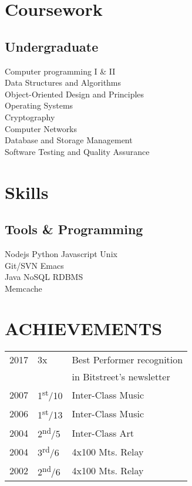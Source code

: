 \documentclass[]{deedy-resume-openfont}
\begin{document}
\begin{minipage}[t]{0.33\textwidth}

\section{Coursework}
\subsection{Undergraduate}
Computer programming I \& II\\
Data Structures and Algorithms\\ 
Object-Oriented Design and Principles\\
Operating Systems\\
Cryptography \\
Computer Networks \\
Database and Storage Management \\
Software Testing and Quality Assurance
\sectionsep


\section{Skills}
\subsection{Tools \& Programming}
Nodejs \textbullet{} Python \textbullet{} Javascript \textbullet{} Unix \\
Git/SVN \textbullet{} Emacs \\
Java \textbullet{} NoSQL \textbullet{} RDBMS\\
Memcache 
\sectionsep


\section{ACHIEVEMENTS}
\begin{tabular}{rll}
  2017 & 3x & Best Performer recognition\\
  & & in Bitstreet's newsletter\\
  2007 & 1\textsuperscript{st}/10 & Inter-Class Music\\
  2006 & 1\textsuperscript{st}/13 & Inter-Class Music\\
  2004 & 2\textsuperscript{nd}/5 & Inter-Class Art\\
  2004 & 3\textsuperscript{rd}/6 & 4x100 Mts. Relay\\
  2002 & 2\textsuperscript{nd}/6 & 4x100 Mts. Relay
\end{tabular}
\sectionsep


\end{minipage}
\end{document}
